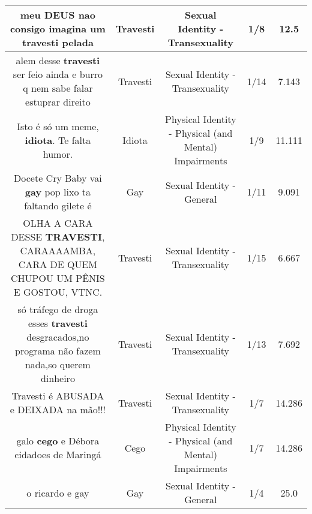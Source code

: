 \documentclass[11pt]{article}
\newlength\mylength
\begin{document}
\begin{center}
\begin{longtable}{|C{.65\mylength}|C{.30\mylength}|C{.12\mylength}|C{.12\mylength}|C{.12\mylength}|}
  \small meu DEUS nao consigo imagina um \textbf{travesti} pelada\normalsize   & Travesti & Sexual Identity - Transexuality & 1/8 & 12.5 \\  \hline
  \small alem desse \textbf{travesti} ser feio ainda e burro q nem sabe falar estuprar direito\normalsize   & Travesti & Sexual Identity - Transexuality & 1/14 & 7.143 \\  \hline
  \small Isto é só um meme, \textbf{idiota}. Te falta humor.\normalsize   & Idiota & Physical Identity - Physical (and Mental) Impairments & 1/9 & 11.111 \\  \hline
  \small Docete Cry Baby vai \textbf{gay} pop lixo ta faltando gilete é\normalsize   & Gay & Sexual Identity - General & 1/11 & 9.091 \\  \hline
  \small OLHA A CARA DESSE \textbf{TRAVESTI}, CARAAAAMBA, CARA DE QUEM CHUPOU UM PÊNIS E GOSTOU, VTNC.\normalsize   & Travesti & Sexual Identity - Transexuality & 1/15 & 6.667 \\  \hline
  \small só tráfego de droga esses \textbf{travesti} desgracados,no programa não fazem nada,so querem dinheiro\normalsize   & Travesti & Sexual Identity - Transexuality & 1/13 & 7.692 \\  \hline
  \small Travesti é ABUSADA e DEIXADA na mão!!!\normalsize   & Travesti & Sexual Identity - Transexuality & 1/7 & 14.286 \\  \hline
  \small galo \textbf{cego} e Débora cidadoes de Maringá\normalsize   & Cego & Physical Identity - Physical (and Mental) Impairments & 1/7 & 14.286 \\  \hline
  \small o ricardo e gay\normalsize   & Gay & Sexual Identity - General & 1/4 & 25.0 \\  \hline

\end{longtable}
\end{center}
\end{document}
